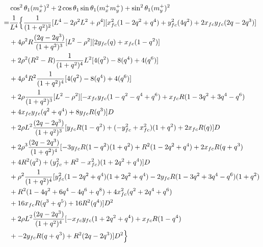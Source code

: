 \documentclass[12pt]{article}
\begin{document}
\begin{align}
    &\cos^2\theta_1(m_x^+)^2  + 2\cos\theta_1\sin\theta_1(m_x^+m_y^+)  +\sin^2\theta_1(m_y^+)^2 \\
    =& \frac{1}{L^4} \Bigl\{ \frac{1}{(1+q^2)^2} [ L^4 -2\rho^2L^2 + \rho^4 ][x_{fc}^2(1-2q^2+q^4)  + y_{fc}^2(4q^2) + 2x_{fc}y_{fc}(2q-2q^3) ] \nonumber\\
    &+  4\rho^2R\frac{(2q-2q^3)}{(1+q^2)^3}[ L^2 - \rho^2 ][ 2y_{fc}(q) + x_{fc}(1-q^2) ] \nonumber\\
    &+ 2\rho^2(R^2-R)\frac{1}{(1+q^2)^4}L^2[4(q^2)-8(q^4)+4(q^6)] \nonumber\\
    &+ 4\rho^4R^2\frac{1}{(1+q^2)^4}[ 4(q^2)-8(q^4)+4(q^6) ] \nonumber\\
    &+ 2\rho\frac{1}{(1+q^2)^3}[ L^2 - \rho^2 ][ -x_{fc}y_{fc}(1-q^2 -q^4+q^6) +x_{fc}R(1-3q^2+3q^4-q^6) \nonumber\\
    &+ 4x_{fc}y_{fc}(q^2+q^4) + 8y_{fc}R(q^3) ]D \nonumber\\
    &+ 2\rho L^2\frac{(2q-2q^3)}{(1+q^2)^3}[y_{fc}R(1-q^2) + (-y_{fc}^2 + x_{fc}^2)(1+q^2) + 2x_{fc}R(q) ]D \nonumber\\
    &+ 2\rho^3\frac{(2q-2q^3)}{(1+q^2)^4}[ -3y_{fc}R(1-q^2)(1+q^2) +R^2(1-2q^2+q^4) + 2x_{fc}R(q+q^3) \nonumber\\
    &+ 4R^2(q^2) +  (y_{fc}^2 +R^2 -x_{fc}^2)(1+2q^2+q^4)  ]D \nonumber\\
    &+ \rho^2\frac{1}{(1+q^2)^4}[y_{fc}^2(1-2q^2+q^4)(1+2q^2+q^4) -2y_{fc}R(1-3q^2+3q^4-q^6)(1+q^2) \nonumber\\
    &+R^2(1-4q^2+ 6q^4-4q^6+q^8) + 4x_{fc}^2(q^2+2q^4+q^6) \nonumber\\
    &+ 16x_{fc}R(q^3+q^5) + 16R^2(q^4)]D^2 \nonumber\\
    &+ 2\rho L^2\frac{(2q-2q^3)}{(1+q^2)^4}[-x_{fc}y_{fc}(1+2q^2+q^4) + x_{fc}R(1-q^4) \nonumber\\
    &+ -2y_{fc}R(q+q^3) +  R^2(2q-2q^3) ]D^2 \Bigr\}
\end{align}
\end{document}
